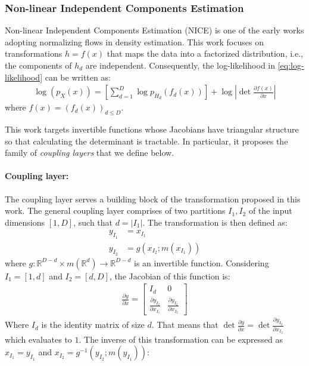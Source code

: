 \documentclass[runningheads]{llncs}
\begin{document}
\subsubsection{Non-linear Independent Components Estimation} \label{sec:nice}

Non-linear Independent Components Estimation (NICE) \cite{dinh2014nice} is one of the early works adopting normalizing flows in density estimation. This work focuses on transformations $h=f(x)$ that maps the data into a factorized distribution, i.e., the components of $h_d$ are independent. Consequently, the log-likelihood in \cref{eq:log-likelihood} can be written as:
\begin{align}
\log(p_X(x)) = \left[\sum_{d=1}^{D}  \log p_{H_d}(f_d(x))\right] +
\log\left| \det\frac{\partial f(x)}{\partial x} \right|
\end{align}
where $f(x) = (f_{d}(x))_{d \leq D}$.

This work targets invertible functions whose Jacobians have triangular structure so that calculating the determinant is tractable. In particular, it proposes the family of \textit{coupling layers} that we define below.

\paragraph{Coupling layer:} The coupling layer serves a building block of the transformation proposed in this work. The general coupling layer comprises of two partitions $I_{1}, I_{2}$ of the input dimensions  $\left[ 1, D \right]$, such that $d = \lvert I_{1} \rvert$. The transformation is then defined as:
\begin{align}
y_{I_{1}} &= x_{I_{1}} \\
y_{I_{2}} &= g(x_{I_{2}} ; m(x_{I_{1}}))
\end{align}
where
$g: \mathbb{R}^{D-d} \times m(\mathbb{R}^{d}) \rightarrow \mathbb{R}^{D-d}$ is an invertible function. Considering 
$I_{1} = \left[ 1, d \right]$ and $I_{2} = \left[ d, D \right]$,
the Jacobian of this function is:
\begin{align*}
\frac{\partial y}{\partial x} =
\begin{bmatrix}
I_{d} & 0 \\
\frac{\partial y_{I_{2}}}{\partial x_{I_{1}}} & \frac{\partial y_{I_{2}}}{\partial x_{I_{2}}} 
\end{bmatrix}
\end{align*}
Where $I_{d}$ is the identity matrix of size $d$. That means that
$\det \frac{\partial y}{\partial x} = \det \frac{\partial y_{I_{2}}}{\partial x_{I_{2}}}$ which evaluates to $1$. 
The inverse of this transformation can be expressed as $x_{I_{1}} = y_{I_{1}}$ and $x_{I_{2}} = g^{-1}(y_{I_{2}} ; m(y_{I_{1}}))$:
\end{document}
